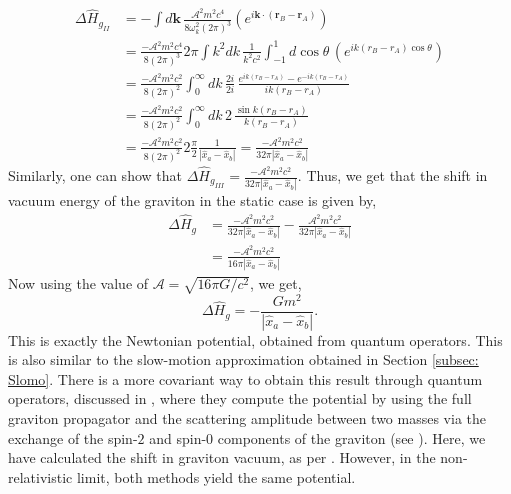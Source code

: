 \documentclass[12pt,a4paper]{report}
\theoremstyle{plain}
\theoremstyle{definition}
\theoremstyle{remark}
\begin{document}
\begin{equation}
    \begin{aligned}
        \Delta \hat{H}_{g_{II}} &= - \int d\bm{k}\, \frac{\mathcal{A}^2 m^2 c^4}{8 \omega_k^2 (2\pi)^3}(e^{i\bm{k}\cdot(\bm{r}_B - \bm{r}_A)})\\
        &= \frac{- \mathcal{A}^2 m^2 c^4}{8 (2\pi)^3} 2\pi \int k^2 dk\,\frac{1}{k^2c^2} \int_{-1}^{1} d\cos{\theta}\,(e^{ik(r_B - r_A)\cos{\theta}}) \\
        &= \frac{- \mathcal{A}^2 m^2 c^2}{8(2\pi)^2} \int_{0}^{\infty} dk\, \frac{2i}{2i} \,\frac{e^{ik(r_B - r_A)} - e^{-ik(r_B - r_A)}}{ik(r_B - r_A)} \\
        &= \frac{- \mathcal{A}^2 m^2 c^2}{8(2\pi)^2} \int_{0}^{\infty} dk\, 2 \,\frac{\sin{k(r_B - r_A)}}{k(r_B - r_A)} \\
        &= \frac{- \mathcal{A}^2 m^2 c^2}{8(2\pi)^2} 2 \frac{\pi}{2} \frac{1}{|\hat{x}_a - \hat{x}_b|} = \frac{- \mathcal{A}^2 m^2 c^2}{32\pi |\hat{x}_a - \hat{x}_b|} 
    \end{aligned}
\end{equation}
Similarly, one can show that $\Delta \hat{H}_{g_{III}} = \frac{- \mathcal{A}^2 m^2 c^2}{32\pi |\hat{x}_a - \hat{x}_b|}$.
Thus, we get that the shift in vacuum energy of the graviton in the static case is given by,
\begin{equation}
    \begin{aligned}
        \Delta \hat{H}_g &= \frac{- \mathcal{A}^2 m^2 c^2}{32\pi |\hat{x}_a - \hat{x}_b|}  - \frac{\mathcal{A}^2 m^2 c^2}{32\pi |\hat{x}_a - \hat{x}_b|} \\
        &= \frac{- \mathcal{A}^2 m^2 c^2}{16\pi |\hat{x}_a - \hat{x}_b|}
    \end{aligned}
\end{equation}
Now using the value of $\mathcal{A} = \sqrt{16\pi G/c^2}$, we get,
\begin{equation}\label{eq: StaticHg}
    \Delta \hat{H}_g = -\frac{Gm^2}{|\hat{x}_a - \hat{x}_b|}.
\end{equation}
This is exactly the Newtonian potential, obtained from quantum operators. This is also similar to the slow-motion approximation obtained in Section \ref{subsec: Slomo}. There is a more covariant way to obtain this result through quantum operators, discussed in \citet{PhysRevA.101.052110}, where they compute the potential by using the full graviton propagator and the scattering amplitude between two masses via the exchange of the spin-$2$ and spin-$0$ components of the graviton (see \cite[Appendix]{PhysRevA.101.052110}). Here, we have calculated the shift in graviton vacuum, as per \citet{Bose_2022}. However, in the non-relativistic limit, both methods yield the same potential.
\end{document}

